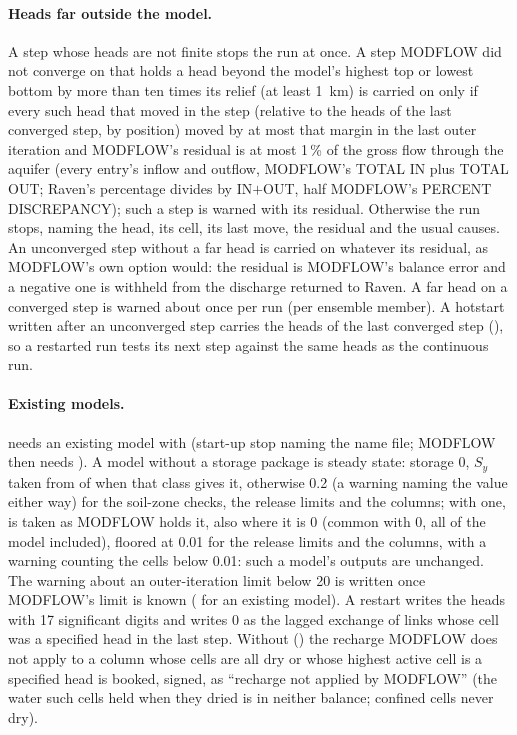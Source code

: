 \paragraph{Heads far outside the model.}\label{sec:farheads} A step whose heads are not finite stops the run at once. A step MODFLOW did not
converge on that holds a head beyond the model's highest top or lowest bottom by more than ten times its relief (at least
1~km) is carried on only if every such head that moved in the step (relative to the heads of the last converged step, by
position) moved by at most that margin in the last outer iteration and MODFLOW's residual is at most 1\,\% of the gross flow
through the aquifer (every entry's inflow and outflow, MODFLOW's TOTAL IN plus TOTAL OUT; Raven's percentage divides by
IN$+$OUT, half MODFLOW's PERCENT DISCREPANCY); such a step is warned with its residual. Otherwise the run stops, naming the
head, its cell, its last move, the residual and the usual causes. An unconverged step without a far head is carried on
whatever its residual, as MODFLOW's own  option would: the residual is MODFLOW's balance error and a negative one
is withheld from the discharge returned to Raven. A far head on a converged step is warned about once per run (per ensemble
member). A hotstart written after an unconverged step carries the heads of the last converged step (),
so a restarted run tests its next step against the same heads as the continuous run.

\paragraph{Existing models.}  needs an existing model with  (start-up stop naming the name
file; MODFLOW then needs ). A model without a storage package is steady state: storage 0,
$S_y$ taken from  of  when that class gives it, otherwise 0.2 (a warning naming
the value either way) for the soil-zone checks, the release limits and the columns; with one,  is taken as
MODFLOW holds it, also where it is 0 (common with  0, all of the model included), floored at 0.01 for the
release limits and the columns, with a warning counting the cells below 0.01: such a model's outputs are unchanged. The warning
about an outer-iteration limit below 20 is written once MODFLOW's limit is known ( for an existing model).
A restart writes the heads with 17 significant digits and writes 0 as the lagged exchange of links whose cell was a specified
head in the last step. Without  () the recharge MODFLOW does not apply to a column whose
cells are all dry or whose highest active cell is a specified head is booked, signed, as ``recharge not applied by MODFLOW''
(the water such cells held when they dried is in neither balance; confined cells never dry).
